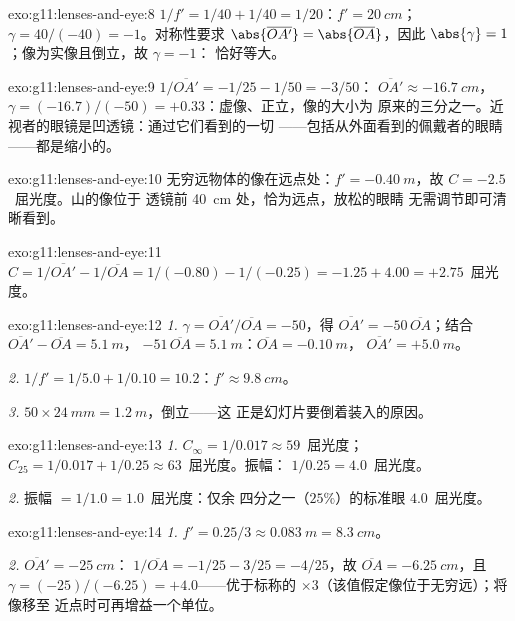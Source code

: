\begin{solution}{exo:g11:lenses-and-eye:8}
$1/f' = 1/40 + 1/40 = 1/20$：$f' = \qty{20}{cm}$；
$\gamma = 40/(-40) = -1$。对称性要求
$\abs{\overline{OA'}} = \abs{\overline{OA}}$，因此
$\abs{\gamma} = 1$；像为实像且倒立，故 $\gamma = -1$：
恰好等大。
\end{solution}

\begin{solution}{exo:g11:lenses-and-eye:9}
$1/\overline{OA'} = -1/25 - 1/50 = -3/50$：
$\overline{OA'} \approx \qty{-16.7}{cm}$，
$\gamma = (-16.7)/(-50) = +0.33$：虚像、正立，像的大小为
原来的三分之一。近视者的眼镜是凹透镜：通过它们看到的一切
——包括从外面看到的佩戴者的眼睛——都是缩小的。
\end{solution}

\begin{solution}{exo:g11:lenses-and-eye:10}
无穷远物体的像在远点处：$f' = \qty{-0.40}{m}$，故
$C = -2.5$~屈光度。山的像位于
透镜前 \qty{40}{cm} 处，恰为远点，放松的眼睛
无需调节即可清晰看到。
\end{solution}

\begin{solution}{exo:g11:lenses-and-eye:11}
$C = 1/\overline{OA'} - 1/\overline{OA} = 1/(-0.80) - 1/(-0.25)
= -1.25 + 4.00 = +2.75$~屈光度。
\end{solution}

\begin{solution}{exo:g11:lenses-and-eye:12}
\emph{1.} $\gamma = \overline{OA'}/\overline{OA} = -50$，得
$\overline{OA'} = -50\,\overline{OA}$；结合
$\overline{OA'} - \overline{OA} = \qty{5.1}{m}$，
$-51\,\overline{OA} = \qty{5.1}{m}$：$\overline{OA} = \qty{-0.10}{m}$，
$\overline{OA'} = +\qty{5.0}{m}$。

\emph{2.} $1/f' = 1/5.0 + 1/0.10 = 10.2$：$f' \approx \qty{9.8}{cm}$。

\emph{3.} $50 \times \qty{24}{mm} = \qty{1.2}{m}$，倒立——这
正是幻灯片要倒着装入的原因。
\end{solution}

\begin{solution}{exo:g11:lenses-and-eye:13}
\emph{1.} $C_\infty = 1/0.017 \approx 59$~屈光度；
$C_{25} = 1/0.017 + 1/0.25 \approx 63$~屈光度。振幅：
$1/0.25 = 4.0$~屈光度。

\emph{2.} 振幅 $= 1/1.0 = 1.0$~屈光度：仅余
四分之一（$25\%$）的标准眼 $4.0$~屈光度。
\end{solution}

\begin{solution}{exo:g11:lenses-and-eye:14}
\emph{1.} $f' = 0.25/3 \approx \qty{0.083}{m} = \qty{8.3}{cm}$。

\emph{2.} $\overline{OA'} = \qty{-25}{cm}$：
$1/\overline{OA} = -1/25 - 3/25 = -4/25$，故
$\overline{OA} = \qty{-6.25}{cm}$，且
$\gamma = (-25)/(-6.25) = +4.0$——优于标称的
$\times 3$（该值假定像位于无穷远）；将像移至
近点时可再增益一个单位。
\end{solution}

